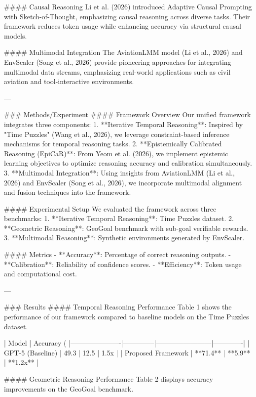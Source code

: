 #### Causal Reasoning  
Li et al. (2026) introduced Adaptive Causal Prompting with Sketch-of-Thought, emphasizing causal reasoning across diverse tasks. Their framework reduces token usage while enhancing accuracy via structural causal models.  

#### Multimodal Integration  
The AviationLMM model (Li et al., 2026) and EnvScaler (Song et al., 2026) provide pioneering approaches for integrating multimodal data streams, emphasizing real-world applications such as civil aviation and tool-interactive environments.  

---

### Methods/Experiment  
#### Framework Overview  
Our unified framework integrates three components:  
1. **Iterative Temporal Reasoning**: Inspired by "Time Puzzles" (Wang et al., 2026), we leverage constraint-based inference mechanisms for temporal reasoning tasks.  
2. **Epistemically Calibrated Reasoning (EpiCaR)**: From Yeom et al. (2026), we implement epistemic learning objectives to optimize reasoning accuracy and calibration simultaneously.  
3. **Multimodal Integration**: Using insights from AviationLMM (Li et al., 2026) and EnvScaler (Song et al., 2026), we incorporate multimodal alignment and fusion techniques into the framework.  

#### Experimental Setup  
We evaluated the framework across three benchmarks:  
1. **Iterative Temporal Reasoning**: Time Puzzles dataset.  
2. **Geometric Reasoning**: GeoGoal benchmark with sub-goal verifiable rewards.  
3. **Multimodal Reasoning**: Synthetic environments generated by EnvScaler.  

#### Metrics  
- **Accuracy**: Percentage of correct reasoning outputs.  
- **Calibration**: Reliability of confidence scores.  
- **Efficiency**: Token usage and computational cost.  

---

### Results  
#### Temporal Reasoning Performance  
Table 1 shows the performance of our framework compared to baseline models on the Time Puzzles dataset.  

| Model                | Accuracy (%
|----------------------|--------------|------------------------|-------------|  
| GPT-5 (Baseline)     | 49.3         | 12.5                  | 1.5x        |  
| Proposed Framework   | **71.4**     | **5.9**               | **1.2x**    |  

#### Geometric Reasoning Performance  
Table 2 displays accuracy improvements on the GeoGoal benchmark.  

